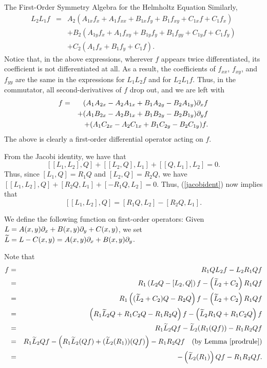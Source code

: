 \begin{section}{The First-Order Symmetry Algebra for the Helmholtz Equation}
Similarly,
\begin{eqnarray*}
L_2L_1f	& = &	A_2(A_{1x}f_x + A_1f_{xx} + B_{1x}f_y + B_1f_{xy} + C_{1x}f + C_1f_x) \\
	&   &	+ B_2(A_{1y}f_x + A_1f_{xy} + B_{1y}f_y + B_1f_{yy} + C_{1y}f + C_1f_y) \\
	&   &	+ C_2(A_1f_x + B_1f_y + C_1f).
\end{eqnarray*}
Notice that, in the above expressions, wherever $f$ appears twice differentiated, its coefficient is not differentiated at all.  As a result, the coefficients of $f_{xx}$, $f_{xy}$, and $f_{yy}$ are the same in the expressions for $L_1L_2f$ and for $L_2L_1f$.  Thus, in the commutator, all second-derivatives of $f$ drop out, and we are left with
\begin{eqnarray*}
[L_1,L_2]f	& = & (A_1A_{2x} - A_2A_{1x} + B_1A_{2y} - B_2A_{1y})\p x f \\
		&   &+(A_1B_{2x} - A_2B_{1x} + B_1B_{2y} - B_2B_{1y})\p y f \\
		&   &+(A_1C_{2x} - A_2C_{1x} + B_1C_{2y} - B_2C_{1y}) f.
\end{eqnarray*}
The above is clearly a first-order differential operator acting on $f$.

\noindent {}  From the Jacobi identity, we have that
\begin{equation}
\label{jacobident}
[[L_1, L_2], Q] + [[L_2, Q], L_1] + [[Q, L_1], L_2] = 0.
\end{equation}
Thus, since $[L_1, Q] = R_1 Q$ and $[L_2, Q] = R_2 Q$, we have $[[L_1,L_2], Q] + [R_2 Q, L_1] + [-R_1 Q, L_2] = 0$.  Thus, (\ref{jacobident}) now implies that
\begin{equation}
\label{usedbelow}
[[L_1,L_2], Q] = [R_1 Q, L_2] - [R_2 Q, L_1].
\end{equation}

We define the following function on first-order operators: Given $L = A(x,y) \partial_{x} + B(x,y) \partial_{y} + C(x,y)$, we set $\widetilde{L} = L - C(x,y) = A(x,y) \partial_{x} + B(x,y) \partial_{y}$.

Note that 
\begin{eqnarray*}
[R_1 Q, L_2]f & = & R_1 Q L_2f - L_2 R_1 Qf \\
	      & = & R_1 \left(L_2 Q - [L_2, Q]\right) f - \left(\wtl_2 + C_2\right) R_1 Qf \\
	      & = & R_1 \left((\wtl_2 + C_2) Q - R_2 Q\right) f - \left(\wtl_2 + C_2\right) R_1 Qf \\
	      & = & \left(R_1 \wtl_2 Q + R_1 C_2 Q - R_1 R_2 Q\right)f - \left( \wtl_2 R_1 Q + R_1 C_2 Q\right) f \\
	      & = & R_1 \wtl_2 Qf - \wtl_2 (R_1 (Qf)) - R_1 R_2 Qf \\
	      & = & R_1 \wtl_2 Qf - \left(R_1 \wtl_2 (Qf) + (\wtl_2 (R_1)) (Qf)\right) - R_1 R_2 Qf \quad \mbox{(by Lemma \ref{prodrule})}\\
	     & = & -\left(\wtl_2 (R_1)\right) Qf - R_1 R_2 Qf.
\end{eqnarray*}


\end{section}
